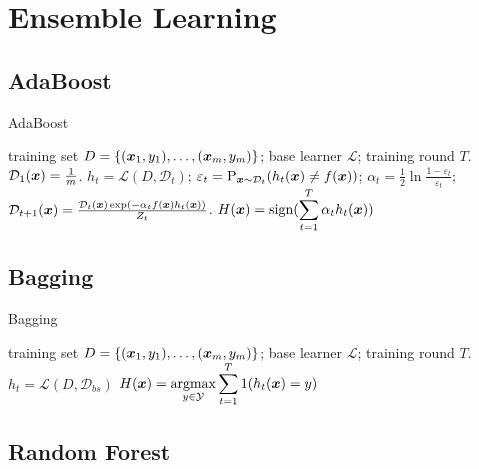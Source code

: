 \section{Ensemble Learning}

\subsection{AdaBoost}

\begin{algorithm}
    \caption{AdaBoost}\label{AdaBoost}
    \begin{algorithmic}[1]
        \Require training set $D = \{(\boldsymbol{x}_1, y_1), \ldots, (\boldsymbol{x}_m, y_m)\}$; base learner $\mathcal{L}$;
        training round $T$.
        \State $\mathcal{D}_1(\boldsymbol{x}) = \frac{1}{m}$.
            \State $h_t = \mathcal{L}(D, \mathcal{D}_t)$;
            \State $\varepsilon_t = \operatorname*{P}_{\boldsymbol{x}\sim\mathcal{D}_t}(h_t(\boldsymbol{x})\neq f(\boldsymbol{x}))$;
            \State $\alpha_t = \frac{1}{2}\ln{\frac{1 - \varepsilon_t}{\varepsilon_t}}$;
            \State $\mathcal{D}_{t + 1}(\boldsymbol{x}) = \frac{\mathcal{D}_t(\boldsymbol{x})\exp(-\alpha_t f(\boldsymbol{x})h_t(\boldsymbol{x}))}
            {Z_t}$.
        \EndFor
        \Ensure $H(\boldsymbol{x}) = \operatorname{sign}(\displaystyle\sum_{t = 1}^T \alpha_t h_t(\boldsymbol{x}))$
    \end{algorithmic}
\end{algorithm}

\subsection{Bagging}

\begin{algorithm}
    \caption{Bagging}\label{Bagging}
    \begin{algorithmic}[1]
        \Require training set $D = \{(\boldsymbol{x}_1, y_1), \ldots, (\boldsymbol{x}_m, y_m)\}$; base learner $\mathcal{L}$;
        training round $T$.
            \State $h_t = \mathcal{L}(D, \mathcal{D}_{bs})$ 
        \EndFor
        \Ensure $H(\boldsymbol{x}) = \displaystyle\operatorname*{argmax}_{y\in \mathcal{Y}}\sum_{t=1}^T 1(h_t(\boldsymbol{x}) = y)$
    \end{algorithmic}
\end{algorithm}

\subsection{Random Forest}

% 